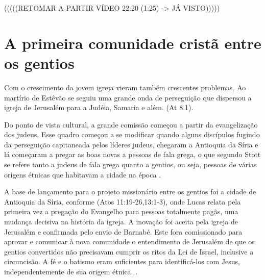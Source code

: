 \documentclass[
	12pt,				%
	openright,			%
	twoside,			%
	a4paper,			%
	english,			%
	french,				%
	spanish,			%
	brazil				%
	]{abntex2}
\begin{document}
{(((((RETOMAR A PARTIR VÍDEO 22:20 (1:25) -> JÁ VISTO)))))



\section{A primeira comunidade cristã entre os gentios}


Com o crescimento da jovem igreja vieram também crescentes problemas. Ao martírio de Estêvão se seguiu uma grande onda de perseguição que dispersou a igreja de Jerusalém para a Judéia, Samaria e além. (At 8.1).

Do ponto de vista cultural, a grande comissão começou a partir da evangelização dos judeus. Esse quadro começou a se modificar quando alguns discípulos fugindo da perseguição capitaneada pelos líderes judeus, chegaram a Antioquia da Síria e lá começaram a pregar as boas novas a pessoas de fala grega, o que segundo Stott se refere tanto a judeus de fala grega quanto a gentios, ou seja, pessoas de várias origens étnicas que habitavam a cidade na época \cite[184]{stott}.

A base de lançamento para o projeto missionário entre os gentios foi a cidade de Antioquia da Síria, conforme (Atos 11:19-26,13:1-3), onde Lucas relata pela primeira vez a pregação do Evangelho para pessoas totalmente pagãs, uma mudança decisiva na história da igreja. A inovação foi aceita pela igreja de Jerusalém e confirmada pelo envio de Barnabé. Este fora comissionado para aprovar e comunicar à nova comunidade o entendimento de Jerusalém de que os gentios convertidos não precisavam cumprir os ritos da Lei de Israel, inclusive a circuncisão. A fé e o batismo eram suficientes para identificá-los com Jesus, independentemente de sua origem étnica. \cite[198]{green}.

}
\end{document}
